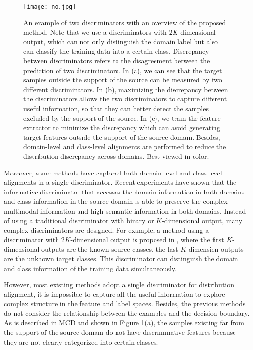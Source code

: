 \documentclass{ecai}
\begin{document}
\begin{figure*}[htbp]
\begin{center}
\texttt{[image: no.jpg]}
\end{center}
\caption{An example of two discriminators with an overview of the proposed method. Note that we use a discriminators with $2K$-dimensional output, which can not only distinguish the domain label but also can classify the training data into a certain class. Discrepancy between discriminators refers to the disagreement between the prediction of two discriminators. In (a), we can see that the target samples outside the support of the source can be measured by two different discriminators. In (b), maximizing the discrepancy between the discriminators allows the two discriminators to capture different useful information, so that they can better detect the samples excluded by the support of the source. In (c), we train the feature extractor to minimize the discrepancy which can avoid generating target features outside the support of the source domain. Besides, domain-level and class-level alignments are performed to reduce the distribution discrepancy across domains. Best viewed in color.}
\label{overall}
\end{figure*}



Moreover, some methods have explored both domain-level and class-level alignments in a single discriminator. Recent experiments have shown that the informative discriminator that accesses the domain information in both domains and class information in the source domain is able to preserve the complex multimodal information and high semantic information in both domains\cite{b14,b15,b16,b17}. Instead of using a traditional discriminator with binary or $K$-dimensional output, many complex discriminators are designed. For example, a method using a discriminator with $2K$-dimensional output is proposed in \cite{b17}, where the first $K$-dimensional outputs are the known source classes, the last $K$-dimension outputs are the unknown target classes. This discriminator can distinguish the domain and class information of the training data simultaneously.

However, most existing methods adopt a single discriminator for distribution alignment, it is impossible to capture all the useful information to explore complex structure in the feature and label spaces. Besides, the previous methods do not consider the relationship between the examples and the decision boundary.  As is described in MCD\cite{b24} and shown in Figure 1(a), the samples existing far from the support of the source domain do not have discriminative features because they are not clearly categorized into certain classes.
\end{document}
